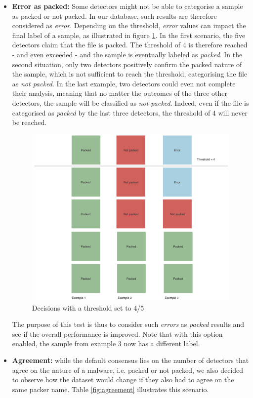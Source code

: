 \begin{itemize}
    \item \textbf{Error as packed:} Some detectors might not be able to categorise a sample as packed or not packed. In our database, such results are therefore considered as \textit{error}. Depending on the threshold, \textit{error} values can impact the final label of a sample, as illustrated in figure \ref{fig:error}. In the first scenario, the five detectors claim that the file is packed. The threshold of 4 is therefore reached - and even exceeded - and the sample is eventually labeled as \textit{packed}. In the second situation, only two detectors positively confirm the packed nature of the sample, which is not sufficient to reach the threshold, categorising the file as \textit{not packed}. In the last example, two detectors could even not complete their analysis, meaning that no matter the outcomes of the three other detectors, the sample will be classified as \textit{not packed}. Indeed, even if the file is categorised as \textit{packed} by the last three detectors, the threshold of 4 will never be reached.
    \begin{figure}[H]
      \centering
      \includegraphics[width=0.8\linewidth]{Figures/error.png}
      \caption{Decisions with a threshold set to 4/5}
      \label{fig:error}
    \end{figure}
    The purpose of this test is thus to consider such \textit{errors} as \textit{packed} results and see if the overall performance is improved. Note that with this option enabled, the sample from example 3 now has a different label.
    \item \textbf{Agreement:} while the default consensus lies on the number of detectors that agree on the nature of a malware, i.e. packed or not packed, we also decided to observe how the dataset would change if they also had to agree on the same packer name. Table \ref{fig:agreement} illustrates this scenario.

\end{itemize}
